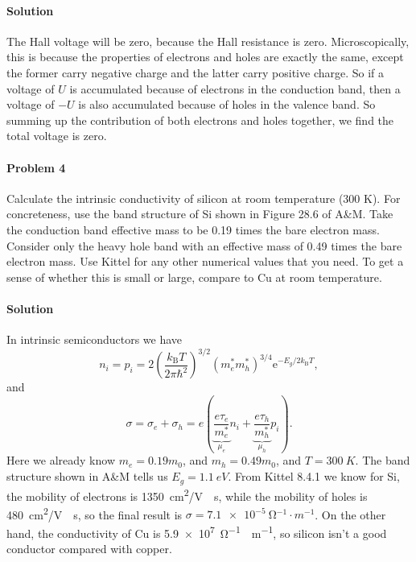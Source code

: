 \documentclass[hyperref, a4paper]{article}
\newcommand*{\ee}{\mathrm{e}}
\begin{document}
\paragraph{Solution} The Hall voltage will be zero, 
because the Hall resistance is zero.
Microscopically, this is because the properties of electrons and holes are exactly the same,
except the former carry negative charge and the latter carry positive charge.
So if a voltage of $U$ is accumulated because of electrons in the conduction band,
then a voltage of $-U$ is also accumulated because of holes in the valence band.
So summing up the contribution of both electrons and holes together,
we find the total voltage is zero.

\paragraph{Problem 4} Calculate the intrinsic conductivity of silicon at room temperature (300 K).  
For concreteness, use the band structure of Si shown in Figure 28.6 of A\&M.  
Take the conduction band effective mass to be 0.19 times the bare electron mass.  
Consider only the heavy hole band with an effective mass of 0.49 times the bare electron mass.  
Use Kittel for any other numerical values that you need.  
To get a sense of whether this is small or large, compare to Cu at room temperature. 

\paragraph{Solution} In intrinsic semiconductors we have
\begin{equation}
    n_i = p_i = 2 \left( \frac{k_{\text{B}} T}{2 \pi \hbar^2} \right)^{3/2} (m_e^* m_h^*)^{3/4} \ee^{- E_g / 2 k_{\text{B}} T}, 
\end{equation}
and 
\begin{equation}
    \sigma = \sigma_e + \sigma_h = e \left( 
        \underbrace{\frac{e \tau_e}{m_e^*}}_{\mu_e} n_i
        + \underbrace{\frac{e \tau_h}{m_h^*}}_{\mu_h} p_i
    \right).
\end{equation}
Here we already know $m_e = 0.19 m_0$, and $m_h = 0.49 m_0$,
and $T = \SI{300}{K}$.
The band structure shown in A\&M tells us $E_g = \SI{1.1}{eV}$.
From Kittel 8.4.1 we know for Si,
the mobility of electrons is \SI{1350}{cm^2/V\cdot s},
while the mobility of holes is \SI{480}{cm^2/V\cdot s},
so the final result is $\sigma = \SI{7.1e-5}{\ohm^{-1} \cdot m^{-1}}$.
On the other hand, the conductivity of Cu is \SI{5.9e7}{\ohm^{-1} \cdot m^{-1}},
so silicon isn't a good conductor compared with copper.
\end{document}
